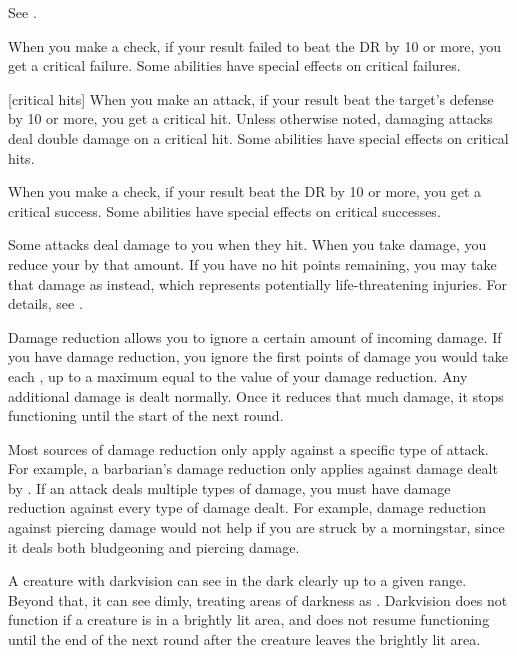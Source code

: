 See .

 When you make a check, if your result failed to beat the DR by 10 or more, you get a critical failure.
Some abilities have special effects on critical failures.

[critical hits] When you make an attack, if your result beat the target's defense by 10 or more, you get a critical hit.
Unless otherwise noted, damaging attacks deal double damage on a critical hit.
Some abilities have special effects on critical hits.

 When you make a check, if your result beat the DR by 10 or more, you get a critical success.
Some abilities have special effects on critical successes.

 Some attacks deal damage to you when they hit.
When you take damage, you reduce your  by that amount.
If you have no hit points remaining, you may take that damage as  instead, which represents potentially life-threatening injuries.
For details, see .

 Damage reduction allows you to ignore a certain amount of incoming damage.
If you have damage reduction, you ignore the first points of damage you would take each , up to a maximum equal to the value of your damage reduction.
Any additional damage is dealt normally.
Once it reduces that much damage, it stops functioning until the start of the next round.

Most sources of damage reduction only apply against a specific type of attack.
For example, a barbarian's damage reduction only applies against damage dealt by .
If an attack deals multiple types of damage, you must have damage reduction against every type of damage dealt.
For example, damage reduction against piercing damage would not help if you are struck by a morningstar, since it deals both bludgeoning and piercing damage.

 A creature with darkvision can see in the dark clearly up to a given range.
Beyond that, it can see dimly, treating areas of darkness as .
Darkvision does not function if a creature is in a brightly lit area, and does not resume functioning until the end of the next round after the creature leaves the brightly lit area.

